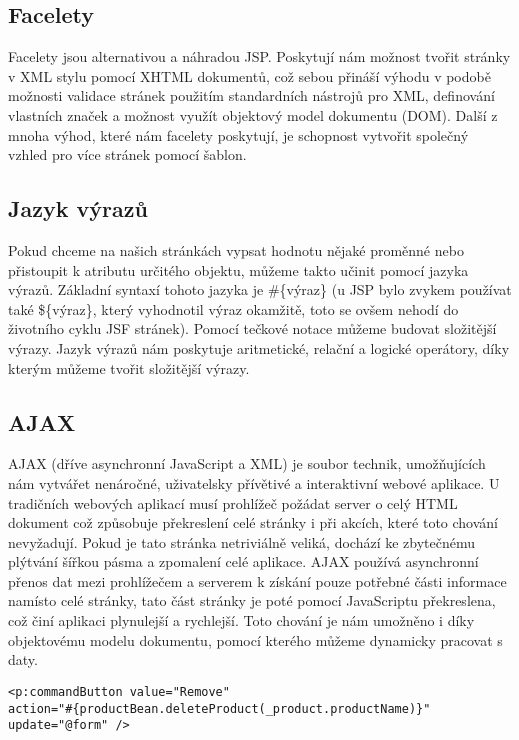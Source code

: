 \documentclass[122pt,oneside]{fithesis}
\begin{document}
\subsection{Facelety}
Facelety jsou alternativou a náhradou JSP. Poskytují nám možnost tvořit stránky v XML stylu pomocí XHTML dokumentů, což sebou přináší výhodu v podobě možnosti validace stránek použitím standardních nástrojů pro XML, definování vlastních značek a možnost využít objektový model dokumentu (DOM). Další z mnoha výhod, které nám facelety poskytují, je schopnost vytvořit společný vzhled pro více stránek pomocí šablon. 

\subsection{Jazyk výrazů}
Pokud chceme na našich stránkách vypsat hodnotu nějaké proměnné nebo přistoupit k atributu určitého objektu, můžeme takto učinit pomocí jazyka výrazů. Základní syntaxí tohoto jazyka je \#\{výraz\} (u JSP bylo zvykem používat také \$\{výraz\}, který vyhodnotil výraz okamžitě, toto se ovšem nehodí do životního cyklu JSF stránek). Pomocí tečkové notace můžeme budovat složitější výrazy. Jazyk výrazů nám poskytuje aritmetické, relační a logické operátory, díky kterým můžeme tvořit složitější výrazy.

\subsection{AJAX}
AJAX (dříve asynchronní JavaScript a XML) je soubor technik, umožňujících nám vytvářet nenáročné, uživatelsky přívětivé a interaktivní webové aplikace. U tradičních webových aplikací musí prohlížeč požádat server o celý HTML dokument což způsobuje překreslení celé stránky i při akcích, které toto chování nevyžadují. Pokud je tato stránka netriviálně veliká, dochází ke zbytečnému plýtvání šířkou pásma a zpomalení celé aplikace. AJAX používá asynchronní přenos dat mezi prohlížečem a serverem k získání pouze potřebné části informace namísto celé stránky, tato část stránky je poté pomocí JavaScriptu překreslena, což činí aplikaci plynulejší a rychlejší. Toto chování je nám umožněno i díky objektovému modelu dokumentu, pomocí kterého můžeme dynamicky pracovat s daty.

\begin{lstlisting}
<p:commandButton value="Remove" 
action="#{productBean.deleteProduct(_product.productName)}"
update="@form" />
\end{lstlisting}
\end{document}
